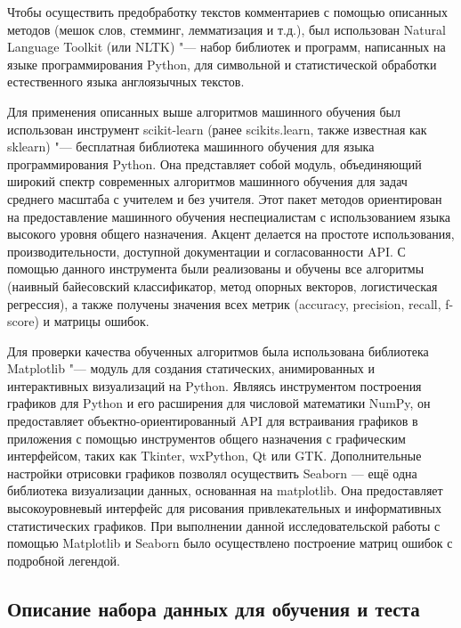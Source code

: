 \documentclass[bachelor, och, coursework]{SCWorks}
\begin{document}
        Чтобы осуществить предобработку текстов комментариев с помощью описанных
        методов (мешок слов, стемминг, лемматизация и т.д.), был использован
        Natural Language Toolkit (или NLTK) "--- набор библиотек и программ,
        написанных на языке программирования Python, для символьной и
        статистической обработки естественного языка англоязычных текстов.
        \cite{fwnltk} 

        Для применения описанных выше алгоритмов машинного обучения был
        использован инструмент scikit-learn (ранее scikits.learn, также
        известная как sklearn) "--- бесплатная библиотека машинного обучения для
        языка программирования Python. Она представляет собой модуль,
        объединяющий широкий спектр современных алгоритмов машинного обучения
        для задач среднего масштаба с учителем и без учителя. Этот пакет методов
        ориентирован на предоставление машинного обучения неспециалистам с
        использованием языка высокого уровня общего назначения. Акцент делается
        на простоте использования, производительности, доступной документации и
        согласованности API. С помощью данного инструмента были реализованы и
        обучены все алгоритмы (наивный байесовский классификатор, метод опорных
        векторов, логистическая регрессия), а также получены значения всех
        метрик (accuracy, precision, recall, f-score) и матрицы ошибок.

        Для проверки качества обученных алгоритмов была использована библиотека
        Matplotlib "--- модуль для создания статических, анимированных и
        интерактивных визуализаций на Python. Являясь инструментом построения
        графиков для Python и его расширения для числовой математики NumPy, он
        предоставляет объектно-ориентированный API для встраивания графиков в
        приложения с помощью инструментов общего назначения с графическим
        интерфейсом, таких как Tkinter, wxPython, Qt или GTK. Дополнительные
        настройки отрисовки графиков позволял осуществить Seaborn — ещё одна
        библиотека визуализации данных, основанная на matplotlib. Она
        предоставляет высокоуровневый интерфейс для рисования привлекательных и
        информативных статистических графиков. При выполнении данной
        исследовательской работы с помощью Matplotlib и Seaborn было
        осуществлено построение матриц ошибок с подробной легендой.

    \subsection{Описание набора данных для обучения и теста}
\end{document}
